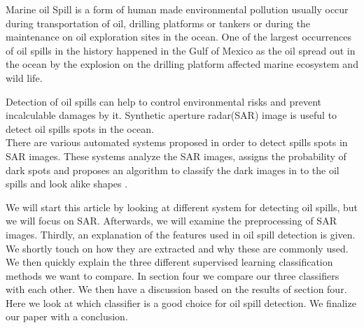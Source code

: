 Marine oil Spill is a form of human made environmental pollution usually occur during transportation of oil, drilling platforms or tankers \cite{Zhang201476}or during the maintenance on oil exploration sites in the ocean. One of the largest occurrences of oil spills in the history happened in the Gulf of Mexico as the oil spread out in the ocean by the explosion on the drilling platform affected marine ecosystem and wild life\cite{Bozeman2011244}.

Detection of oil spills can help to control environmental risks and prevent incalculable damages by it. Synthetic aperture radar(SAR) image is useful to detect oil spills spots in the ocean. \\
There are various automated systems proposed in order to detect spills spots in SAR images. These systems analyze the SAR images, assigns the probability of dark spots and proposes an algorithm to classify the dark images in to the oil spills and look alike shapes \cite{Xu201414,brekke2008classifiers,Keramitsoglou2006640,Guo2014146}.

We will start this article by looking at different system for detecting oil spills, but we will focus on SAR. Afterwards, we will examine the preprocessing of SAR images. Thirdly, an explanation of the features used in oil spill detection is given. We shortly touch on how they are extracted and why these are commonly used. We then quickly explain the three different supervised learning classification methods we want to compare. In section four we compare our three classifiers with each other. We then have a discussion based on the results of section four. Here we look at which classifier is a good choice for oil spill detection. We finalize our paper with a conclusion.